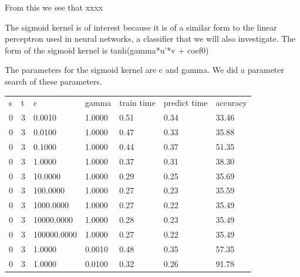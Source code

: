 \documentclass[12pt,oneside]{book}
\begin{document}
From this we see that xxxx


%
%

The sigmoid kernel is of interest because it is of a similar form to
the linear perceptron used in neural networks, a classifier that we
will also investigate.  The form of the sigmoid kernel is tanh(gamma*u'*v + coef0)

The parameters for the sigmoid kernel are c and gamma.  We did a
parameter search of these parameters.

\begin{table}
\begin{tabular}{|l|l|l|l|l|l|l|}
\hline

s               & t               & c               & gamma           & train time      & predict time    & accuracy        \\
0               & 3               & 0.0010          & 1.0000          & 0.51            & 0.34            & 33.46           \\
0               & 3               & 0.0100          & 1.0000          & 0.47            & 0.33            & 35.88           \\
0               & 3               & 0.1000          & 1.0000          & 0.44            & 0.37            & 51.35           \\
0               & 3               & 1.0000          & 1.0000          & 0.37            & 0.31            & 38.30           \\
0               & 3               & 10.0000         & 1.0000          & 0.29            & 0.25            & 35.69           \\
0               & 3               & 100.0000        & 1.0000          & 0.27            & 0.23            & 35.59           \\
0               & 3               & 1000.0000       & 1.0000          & 0.27            & 0.22            & 35.49           \\
0               & 3               & 10000.0000      & 1.0000          & 0.28            & 0.23            & 35.49           \\
0               & 3               & 100000.0000     & 1.0000          & 0.27            & 0.22            & 35.49           \\
0               & 3               & 1.0000          & 0.0010          & 0.48            & 0.35            & 57.35           \\
0               & 3               & 1.0000          & 0.0100          & 0.32            & 0.26            & 91.78           \\

\end{tabular}
\end{table}
\end{document}
